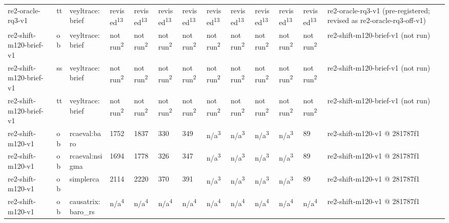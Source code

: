 \begin{table}[t]
\begin{tabular}{lllllllllllll}
re2-oracle-rq3-v1 & tt & veyltrace:brief & revised\textsuperscript{13} & revised\textsuperscript{13} & revised\textsuperscript{13} & revised\textsuperscript{13} & revised\textsuperscript{13} & revised\textsuperscript{13} & revised\textsuperscript{13} & revised\textsuperscript{13} & revised\textsuperscript{13} & re2-oracle-rq3-v1 (pre-registered; revised as re2-oracle-rq3-off-v1) \\
re2-shift-m120-brief-v1 & ob & veyltrace:brief & not run\textsuperscript{2} & not run\textsuperscript{2} & not run\textsuperscript{2} & not run\textsuperscript{2} & not run\textsuperscript{2} & not run\textsuperscript{2} & not run\textsuperscript{2} & not run\textsuperscript{2} & not run\textsuperscript{2} & re2-shift-m120-brief-v1 (not run) \\
re2-shift-m120-brief-v1 & ss & veyltrace:brief & not run\textsuperscript{2} & not run\textsuperscript{2} & not run\textsuperscript{2} & not run\textsuperscript{2} & not run\textsuperscript{2} & not run\textsuperscript{2} & not run\textsuperscript{2} & not run\textsuperscript{2} & not run\textsuperscript{2} & re2-shift-m120-brief-v1 (not run) \\
re2-shift-m120-brief-v1 & tt & veyltrace:brief & not run\textsuperscript{2} & not run\textsuperscript{2} & not run\textsuperscript{2} & not run\textsuperscript{2} & not run\textsuperscript{2} & not run\textsuperscript{2} & not run\textsuperscript{2} & not run\textsuperscript{2} & not run\textsuperscript{2} & re2-shift-m120-brief-v1 (not run) \\
re2-shift-m120-v1 & ob & rcaeval:baro & 1752 & 1837 & 330 & 349 & n/a\textsuperscript{3} & n/a\textsuperscript{3} & n/a\textsuperscript{3} & n/a\textsuperscript{3} & 89 & re2-shift-m120-v1 @ 281787f1 \\
re2-shift-m120-v1 & ob & rcaeval:nsigma & 1694 & 1778 & 326 & 347 & n/a\textsuperscript{3} & n/a\textsuperscript{3} & n/a\textsuperscript{3} & n/a\textsuperscript{3} & 89 & re2-shift-m120-v1 @ 281787f1 \\
re2-shift-m120-v1 & ob & simplerca & 2114 & 2220 & 370 & 391 & n/a\textsuperscript{3} & n/a\textsuperscript{3} & n/a\textsuperscript{3} & n/a\textsuperscript{3} & 89 & re2-shift-m120-v1 @ 281787f1 \\
re2-shift-m120-v1 & ob & causatrix:baro\_rs & n/a\textsuperscript{4} & n/a\textsuperscript{4} & n/a\textsuperscript{4} & n/a\textsuperscript{4} & n/a\textsuperscript{4} & n/a\textsuperscript{4} & n/a\textsuperscript{4} & n/a\textsuperscript{4} & n/a\textsuperscript{4} & re2-shift-m120-v1 @ 281787f1 \\

\end{tabular}
\end{table}
